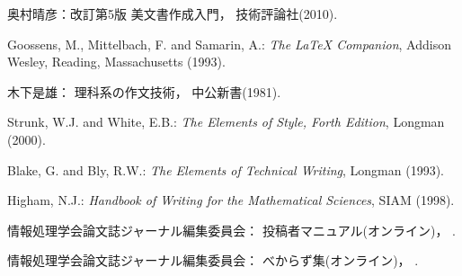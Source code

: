 \documentclass[submit,techrep]{ipsj}
\begin{document}
\begin{thebibliography}{9}
奥村晴彦：改訂第5版 \LaTeXe 美文書作成入門，
技術評論社(2010).

Goossens, M., Mittelbach, F. and Samarin, A.: {\it The LaTeX Companion},
Addison Wesley, Reading, Massachusetts (1993).

木下是雄：
理科系の作文技術，
中公新書(1981).

Strunk, W.J. and White, E.B.: {\it The Elements of Style, Forth Edition},
Longman (2000).

Blake, G. and Bly, R.W.: {\it The Elements of Technical Writing},
Longman (1993).

Higham, N.J.:
{\it Handbook of Writing for the Mathematical Sciences},
SIAM (1998).

情報処理学会論文誌ジャーナル編集委員会：
投稿者マニュアル(オンライン)，
%
.

情報処理学会論文誌ジャーナル編集委員会：
べからず集(オンライン)，
%
.

\end{thebibliography}

\begin{biography}
%
%
\end{biography}
\end{document}
